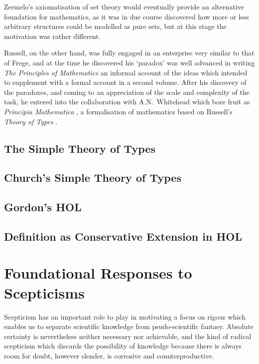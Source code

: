 \documentclass[10pt,titlepage]{book}
\begin{document}
Zermelo's axiomatisation of set theory would eventually provide an alternative foundation for mathematics, as it was in due course discovered how more or less arbitrary structures could be modelled as pure sets, but at this stage the motivation was rather different.

Russell, on the other hand, was fully engaged in an enterprise very similar to that of Frege, and at the time he discovered his `paradox' was well advanced in writing \emph{The Principles of Mathematics}\cite{russellPRM} an informal account of the ideas which intended to  supplement with a formal account in a second volume.
After his discovery of the paradoxes, and coming to an appreciation of the scale and complexity of the task, he entered into the collaboration with A.N.~Whitehead which bore fruit as \emph{Principia Mathematica} \cite{russell1913}, a formalisation of mathematics based on Russell's \emph{Theory of Types} \cite{russell1908}.

\section{The Simple Theory of Types}

\section{Church's Simple Theory of Types}

\section{Gordon's HOL}

\section{Definition as Conservative Extension in HOL}

\chapter{Foundational Responses to Scepticisms}\label{ChapFRS}

Scepticism has an important role to play in motivating a focus on rigour which enables us to separate scientific knowledge from psudo-scientific fantasy.
Absolute certainty is nevertheless neither necessary nor achievable, and the kind of radical scepticism which discards the possibility of knowledge because there is always room for doubt, however slender, is corrosive and counterproductive.
\end{document}
